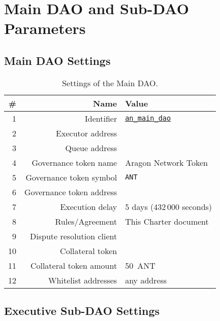 
\chapter{Main DAO and Sub-DAO Parameters}
\label{chap:DAOParameters}
\restartnumbering

\section{Main DAO Settings}

\begin{table}[h!]
	\caption{Settings of the Main DAO.}
	\centering
	\begin{tabular}{rrl}
		\toprule
		\# & Name & Value \\
		\midrule
		 1 & Identifier					& \href{https://govern.aragon.org/\#/daos/an_main_dao}{\texttt{an\_main\_dao}}\\
		 2 & Executor address			& \mainDaoAddr\\
		 3 & Queue address				& \mainDaoQueueAddr\\
		 4 & Governance token name		& Aragon Network Token\\
		 5 & Governance token symbol	& \texttt{\ac{ANT}}\\
		 6 & Governance token address	& \mainDaoTokenAddr\\
		 7 & Execution delay			& 5 days (432\,000 seconds)\\
		 8 & Rules/Agreement			& This Charter document\\
		 9 & Dispute resolution client	& \aragonCourtAddr\\
		10 & Collateral token			& \antTokenAddr\\
		11 & Collateral token amount	& 50~\ac{ANT}\\
		12 & Whitelist addresses 		& any address\\
		\bottomrule
	\end{tabular}
\end{table}


\section{Executive Sub-DAO Settings}

